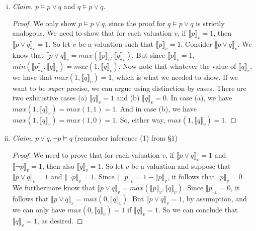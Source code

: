 \begin{enumerate}[\thesection.1]
\begin{enumerate}[(i)]
			\begin{proof}
			We only show $p\land q\vDash p$, since the proof for  $p\land q\vDash q$ is strictly analogous. We need to show that for each valuation $v$, if $\llbracket p\land q\rrbracket_v=1$, then $\llbracket p\rrbracket_v=1$. So, assume that $v$ is a valuation and $\llbracket p\land q\rrbracket_v=1$. We know that $\llbracket p\land q\rrbracket_v=min(\llbracket p\rrbracket_v, \llbracket q\rrbracket_v)$. But the only way that $min(\llbracket p\rrbracket_v, \llbracket q\rrbracket_v)=1$ is that both $\llbracket p\rrbracket_v=1$ and $\llbracket q\rrbracket_v=1$. Hence $\llbracket p\rrbracket_v=1$, as desired.
			\end{proof}
			
			\item \emph{Claim}. $p\vDash p\lor q$ and $q\vDash p\lor q$.
			
			\begin{proof}
			We only show $p\vDash p\lor q$, since the proof for $q\vDash p\lor q$ is strictly analogous. We need to show that for each valuation $v$, if $\llbracket p\rrbracket_v=1$, then $\llbracket p\lor q\rrbracket_v=1$. So let $v$ be a valuation such that $\llbracket p\rrbracket_v=1$. Consider $\llbracket p\lor q\rrbracket_v$. We know that $\llbracket p\lor q\rrbracket_v=max(\llbracket p\rrbracket_v,\llbracket q\rrbracket_v)$. But since $\llbracket p\rrbracket_v=1$, $min(\llbracket p\rrbracket_v,\llbracket q\rrbracket_v)=max(1, \llbracket q\rrbracket_v)$. Now note that whatever the value of $\llbracket q\rrbracket_v$, we have that $max(1, \llbracket q\rrbracket_v)=1$, which is what we needed to show. If we want to be \emph{super} precise, we can argue using distinction by cases. There are two exhaustive cases (a) $\llbracket q\rrbracket_v=1$ and (b) $\llbracket q\rrbracket_v=0$. In case (a), we have $max(1, \llbracket q\rrbracket_v)=max(1,1)=1$. And in case (b), we have $max(1, \llbracket q\rrbracket_v)=max(1,0)=1$. So, either way, $max(1, \llbracket q\rrbracket_v)=1$.
			\end{proof}
			
			\item \emph{Claim}. $p\lor q, \neg p\vDash q$ (remember inference (1) from \S1)
			
			\begin{proof}
			We need to prove that for each valuation $v$, if $\llbracket p\lor q\rrbracket_v=1$ and $\llbracket \neg p\rrbracket_v=1$, then also $\llbracket q\rrbracket_v=1$. So let $v$ be a valuation and suppose that $\llbracket p\lor q\rrbracket_v=1$ and $\llbracket \neg p\rrbracket_v=1$. Since $\llbracket \neg p\rrbracket_v=1-\llbracket p\rrbracket_v$, it follows that $\llbracket p\rrbracket_v=0$. We furthermore know that $\llbracket p\lor q\rrbracket_v=max(\llbracket p\rrbracket_v, \llbracket q\rrbracket_v)$. Since  $\llbracket p\rrbracket_v=0$, it follows that $\llbracket p\lor q\rrbracket_v=max(0, \llbracket q\rrbracket_v)$. But $\llbracket p\lor q\rrbracket_v=1$, by assumption, and we can only have $max(0, \llbracket q\rrbracket_v)=1$ if $\llbracket q\rrbracket_v=1$. So we can conclude that $\llbracket q\rrbracket_v=1$, as desired.
			\end{proof}
			

\end{enumerate}
\end{enumerate}
